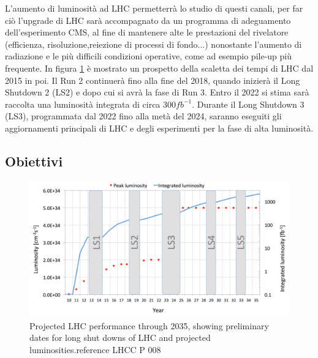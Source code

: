 L'aumento di luminosità ad LHC permetterrà lo studio di questi canali, per far ciò  l'upgrade di LHC sarà accompagnato da un programma di adeguamento dell'esperimento CMS, al fine di mantenere alte le prestazioni del rivelatore (efficienza, risoluzione,reiezione di processi di fondo...) nonostante l'aumento di radiazione e le più difficili condizioni operative, come ad esempio pile-up più frequente.
In figura \ref{HL-LHC} è mostrato un prospetto della scaletta dei tempi di LHC dal 2015 in poi. Il Run 2 continuerà fino alla fine del 2018, quando inizierà il Long Shutdown 2 (LS2) e dopo cui si avrà la fase di Run 3.  Entro il 2022 si stima sarà raccolta una luminosità integrata di circa $300 fb^{-1}$. 
Durante il Long Shutdown 3 (LS3), programmata dal 2022 fino alla metà del 2024, saranno eseguiti gli aggiornamenti principali di LHC e degli esperimenti per la fase di alta luminosità.

\subsection{Obiettivi}
\begin{figure}
\centering
\includegraphics[scale=.35]{Immagini/HL-LHC}
\caption{Projected LHC performance through 2035, showing preliminary dates for long shut downs of LHC and projected luminosities.reference LHCC P 008}
\label{HL-LHC}
\end{figure}

